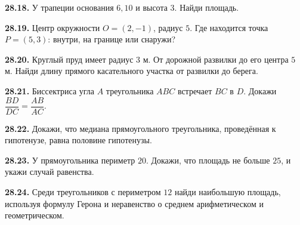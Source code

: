 \noindent\begin{minipage}[t]{\linewidth}\textbf{28.18.} У трапеции основания \(6,10\) и высота \(3\). Найди площадь.\par\end{minipage}\par
\noindent\begin{minipage}[t]{\linewidth}\textbf{28.19.} Центр окружности \(O=(2,-1)\), радиус \(5\). Где находится точка \(P=(5,3)\): внутри, на границе или снаружи?\par\end{minipage}\par
\noindent\begin{minipage}[t]{\linewidth}\textbf{28.20.} Круглый пруд имеет радиус \(3\) м. От дорожной развилки до его центра \(5\) м. Найди длину прямого касательного участка от развилки до берега.\par\end{minipage}\par
\noindent\begin{minipage}[t]{\linewidth}\textbf{28.21.}\starmark{} Биссектриса угла \(A\) треугольника \(ABC\) встречает \(BC\) в \(D\). Докажи \(\dfrac{BD}{DC}=\dfrac{AB}{AC}\).\par\end{minipage}\par
\noindent\begin{minipage}[t]{\linewidth}\textbf{28.22.}\starmark{} Докажи, что медиана прямоугольного треугольника, проведённая к гипотенузе, равна половине гипотенузы.\par\end{minipage}\par
\noindent\begin{minipage}[t]{\linewidth}\textbf{28.23.}\starmark{} У прямоугольника периметр \(20\). Докажи, что площадь не больше \(25\), и укажи случай равенства.\par\end{minipage}\par
\noindent\begin{minipage}[t]{\linewidth}\textbf{28.24.}\starmark{} Среди треугольников с периметром \(12\) найди наибольшую площадь, используя формулу Герона и неравенство о среднем арифметическом и геометрическом.\par\end{minipage}\par
\endgroup
